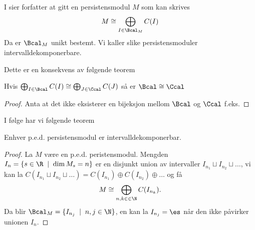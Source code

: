 I \cite{Bauer2015a} sier forfatter at gitt en persistensmodul $M$ som kan skrives
\[M\cong\bigoplus_{I\in\Bcal_M}C(I)\]
Da er $\Bcal_M$ unikt bestemt. Vi kaller slike persistensmoduler intervalldekomponerbare.

Dette er en konsekvens av følgende teorem

\begin{theorem}\label{Thrm:label}
    Hvis $\bigoplus_{I\in\Bcal}C(I)\cong\bigoplus_{J\in\Ccal} C(J)$ så er $\Bcal\cong\Ccal$
\end{theorem}
\begin{proof}
Anta at det ikke eksisterer en bijeksjon mellom $\Bcal$ og $\Ccal$ f.eks. 
\end{proof}

I følge \cite{Bauer2015a} har vi følgende teorem
\begin{theorem}\label{Thrm:thrm2.1}
	Enhver p.e.d. persistensmodul er intervalldekomponerbar.
\end{theorem}
\begin{proof}
	La $M$ være en p.e.d. peristensmodul. Mengden $I_n = \{s\in\R\;\mid\;\dim M_s=n\}$ er en disjunkt union av intervaller $I_{n_1}\sqcup I_{n_2}\sqcup\dots$, vi kan la $C(I_{n_1}\sqcup I_{n_2}\sqcup\dots)=C(I_{n_1})\oplus C(I_{n_2})\oplus\dots$ og få
	\[M\cong \bigoplus_{n,k\in\in\N} C(I_{n_k}).\]
	Da blir $\Bcal_M = \{I_{n_j}\;\mid\; n,j\in\N\}$, en kan la $I_{n_j}=\es$ når den ikke påvirker unionen $I_n$. 
\end{proof}

